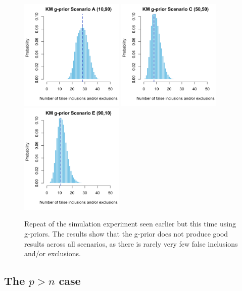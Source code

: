\begin{figure}[h]
	\centering
	\includegraphics[height=2.1in]{figure/Ag} \hspace{-4mm}
	\includegraphics[height=2.1in]{figure/Cg} \hspace{-4mm}
	\includegraphics[height=2.1in]{figure/Eg}
	\label{fig:gpriorsim}
	\caption{Repeat of the simulation experiment seen earlier but this time using g-priors. The results show that the g-prior does not produce good results across all scenarios, as there is rarely very few false inclusions and/or exclusions.}
\end{figure}

\vspace{-2mm}
\subsection{The \texorpdfstring{$p > n$}{p > n} case}
\vspace{-2mm}

